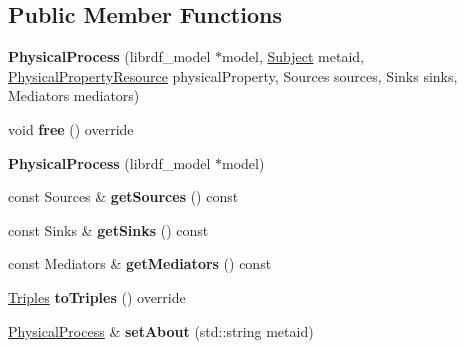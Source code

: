 \subsection*{Public Member Functions}
\begin{DoxyCompactItemize}
\item 
\mbox{\label{classsemsim_1_1PhysicalProcess_ae000179654944f3e35b20485d2f0adf0}} 
{\bfseries Physical\+Process} (librdf\+\_\+model $\ast$model, \hyperlink{classsemsim_1_1Subject}{Subject} metaid, \hyperlink{classsemsim_1_1PhysicalPropertyResource}{Physical\+Property\+Resource} physical\+Property, Sources sources, Sinks sinks, Mediators mediators)
\item 
\mbox{\label{classsemsim_1_1PhysicalProcess_abe6be94626981d15e27615e040fdda2f}} 
void {\bfseries free} () override
\item 
\mbox{\label{classsemsim_1_1PhysicalProcess_aaf6d4c0263198fc9355ca4d74221f35d}} 
{\bfseries Physical\+Process} (librdf\+\_\+model $\ast$model)
\item 
\mbox{\label{classsemsim_1_1PhysicalProcess_a6d3ea622c0f1fa642068b1b7e76385e5}} 
const Sources \& {\bfseries get\+Sources} () const
\item 
\mbox{\label{classsemsim_1_1PhysicalProcess_aa7ec750398cf738c374c9e92c0bb5670}} 
const Sinks \& {\bfseries get\+Sinks} () const
\item 
\mbox{\label{classsemsim_1_1PhysicalProcess_a127806bf74ec1e31514c6f3d659824b3}} 
const Mediators \& {\bfseries get\+Mediators} () const
\item 
\mbox{\label{classsemsim_1_1PhysicalProcess_a90d27a6f08b58a7917da00dfbfb5ff72}} 
\hyperlink{classsemsim_1_1Triples}{Triples} {\bfseries to\+Triples} () override
\item 
\mbox{\label{classsemsim_1_1PhysicalProcess_a1caf11364214c1f0e379729e92333208}} 
\hyperlink{classsemsim_1_1PhysicalProcess}{Physical\+Process} \& {\bfseries set\+About} (std\+::string metaid)

\end{DoxyCompactItemize}
